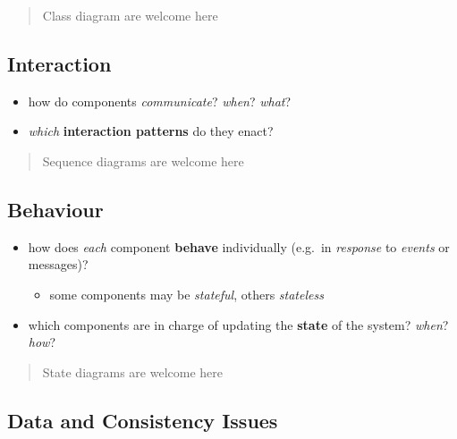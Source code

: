 \documentclass{scrartcl}
\begin{document}
\begin{quote}
Class diagram are welcome here
\end{quote}

\subsection{Interaction}\label{interaction}

\begin{itemize}
  \item how do components \emph{communicate}? \emph{when}? \emph{what}?
  \item \emph{which} \textbf{interaction patterns} do they enact?
\end{itemize}

\begin{quote}
Sequence diagrams are welcome here
\end{quote}

\subsection{Behaviour}\label{behaviour}

\begin{itemize}
  \item how does \emph{each} component \textbf{behave} individually (e.g.~in
  \emph{response} to \emph{events} or messages)?

  \begin{itemize}
    \item some components may be \emph{stateful}, others \emph{stateless}
  \end{itemize}
  \item which components are in charge of updating the \textbf{state} of the
  system? \emph{when}? \emph{how}?
\end{itemize}

\begin{quote}
State diagrams are welcome here
\end{quote}

\subsection{Data and Consistency
Issues}\label{data-and-consistency-issues}
\end{document}
